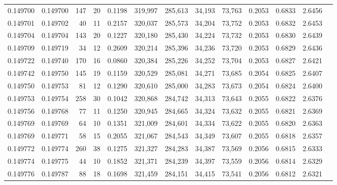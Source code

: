 \begin{tabular}{rrrrrrrrrrrrr}
0.149700 & 0.149700 &   147 &  20 &                                     0.1198 & 319,997 & 285,613 &  34,193 &  73,763 & 0.2053 & 0.6833 & 2.6456 \\
0.149701 & 0.149702 &    40 &  11 &                                     0.2157 & 320,037 & 285,573 &  34,204 &  73,752 & 0.2053 & 0.6832 & 2.6453 \\
0.149704 & 0.149704 &   143 &  20 &                                     0.1227 & 320,180 & 285,430 &  34,224 &  73,732 & 0.2053 & 0.6830 & 2.6439 \\
0.149709 & 0.149719 &    34 &  12 &                                     0.2609 & 320,214 & 285,396 &  34,236 &  73,720 & 0.2053 & 0.6829 & 2.6436 \\
0.149722 & 0.149740 &   170 &  16 &                                     0.0860 & 320,384 & 285,226 &  34,252 &  73,704 & 0.2053 & 0.6827 & 2.6421 \\
0.149742 & 0.149750 &   145 &  19 &                                     0.1159 & 320,529 & 285,081 &  34,271 &  73,685 & 0.2054 & 0.6825 & 2.6407 \\
0.149750 & 0.149753 &    81 &  12 &                                     0.1290 & 320,610 & 285,000 &  34,283 &  73,673 & 0.2054 & 0.6824 & 2.6400 \\
0.149753 & 0.149754 &   258 &  30 &                                     0.1042 & 320,868 & 284,742 &  34,313 &  73,643 & 0.2055 & 0.6822 & 2.6376 \\
0.149756 & 0.149768 &    77 &  11 &                                     0.1250 & 320,945 & 284,665 &  34,324 &  73,632 & 0.2055 & 0.6821 & 2.6369 \\
0.149769 & 0.149769 &    64 &  10 &                                     0.1351 & 321,009 & 284,601 &  34,334 &  73,622 & 0.2055 & 0.6820 & 2.6363 \\
0.149769 & 0.149771 &    58 &  15 &                                     0.2055 & 321,067 & 284,543 &  34,349 &  73,607 & 0.2055 & 0.6818 & 2.6357 \\
0.149772 & 0.149774 &   260 &  38 &                                     0.1275 & 321,327 & 284,283 &  34,387 &  73,569 & 0.2056 & 0.6815 & 2.6333 \\
0.149774 & 0.149775 &    44 &  10 &                                     0.1852 & 321,371 & 284,239 &  34,397 &  73,559 & 0.2056 & 0.6814 & 2.6329 \\
0.149776 & 0.149787 &    88 &  18 &                                     0.1698 & 321,459 & 284,151 &  34,415 &  73,541 & 0.2056 & 0.6812 & 2.6321 \\

\end{tabular}
